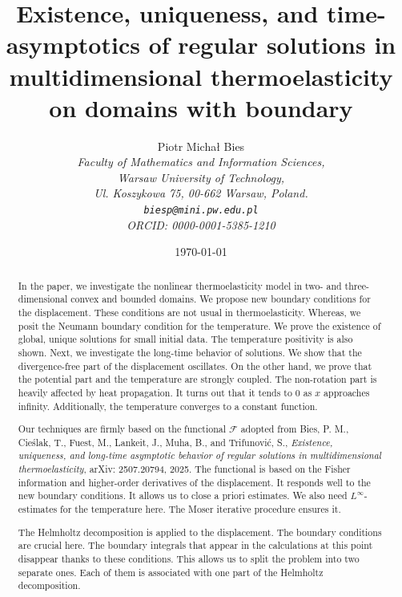 \documentclass[11pt]{article}
\numberwithin{equation}{section}
\theoremstyle{plain}
\newcommand{\F}{\mathcal{F}}
\begin{document}
	\date{\today}
	\title{\bf Existence, uniqueness, and time-asymptotics of regular solutions in multidimensional thermoelasticity on domains with boundary}
	\author{Piotr Micha{\l} Bies\\
\it\small{Faculty of Mathematics and Information Sciences,}\\
\it\small{Warsaw University of Technology,}\\
\it\small{Ul. Koszykowa 75, 00-662 Warsaw, Poland.}\\
{\tt biesp@mini.pw.edu.pl}\\
{\small ORCID: 0000-0001-5385-1210}}
\maketitle
	
\begin{abstract}
\noindent In the paper, we investigate the nonlinear thermoelasticity model in two- and three-dimensional convex and bounded domains. We propose new boundary conditions for the displacement. These conditions are not usual in thermoelasticity. Whereas, we posit the Neumann boundary condition for the temperature. We prove the existence of global, unique solutions for small initial data. The temperature positivity is also shown. Next, we investigate the long-time behavior of solutions. We show that the divergence-free part of the displacement oscillates. On the other hand, we prove that the potential part and the temperature are strongly coupled. The non-rotation part is heavily affected by heat propagation. It turns out that it tends to $0$ as $x$ approaches infinity. Additionally, the temperature converges to a constant function.

Our techniques are firmly based on the functional $\F$ adopted from  {\sc Bies, P. M., Cie\'slak, T., Fuest, M., Lankeit, J., Muha, B., and Trifunovi\'c, S.}, \emph{Existence, uniqueness, and long-time asymptotic behavior of regular solutions in multidimensional thermoelasticity}, arXiv: 2507.20794, 2025. The functional is based on the Fisher information and higher-order derivatives of the displacement. It responds well to the new boundary conditions. It allows us to close a priori estimates. We also need $L^{\infty}$-estimates for the temperature here. The Moser iterative procedure ensures it.

The Helmholtz decomposition is applied to the displacement. The boundary conditions are crucial here. The boundary integrals that appear in the calculations at this point disappear thanks to these conditions. This allows us to split the problem into two separate ones. Each of them is associated with one part of the Helmholtz decomposition.
\end{abstract}
\end{document}
